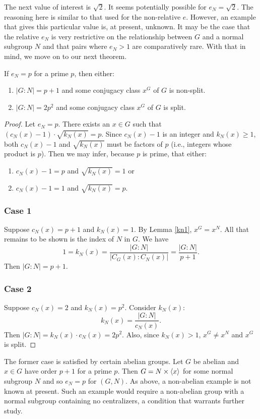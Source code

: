 \documentclass[main.tex]{subfiles}
\begin{document}
The next value of interest is $\sqrt{2}$. It seems potentially possible for $e_N = \sqrt{2}$. The reasoning here is similar to that used for the non-relative $e$. However, an example that gives this particular value is, at present, unknown. It may be the case that the relative $e_N$ is very restrictive on the relationship between $G$ and a normal subgroup $N$ and that pairs where $e_N > 1$ are comparatively rare. With that in mind, we move on to our next theorem.

\begin{theorem}
If $e_N = p$ for a prime $p$, then either:
\begin{enumerate}
	\item $|G:N| = p + 1$ and some conjugacy class $x^G$ of $G$ is non-split.
	\item $|G:N| = 2p^2$ and some conjugacy class $x^G$ of $G$ is split.
\end{enumerate}
\end{theorem}

\begin{proof}
Let $e_N = p$. There exists an $x \in G$ such that $(c_N(x) - 1) \cdot \sqrt{k_N(x)} = p$. Since $c_N(x) - 1$ is an integer and $k_N(x) \ge 1$, both $c_N(x) - 1$ and $\sqrt{k_N(x)}$ must be factors of $p$ (i.e., integers whose product is $p$). Then we may infer, because $p$ is prime, that either:
\begin{enumerate}
	\item $c_N(x) - 1 = p$ and $\sqrt{k_N(x)} = 1$ or
	\item $c_N(x) - 1 = 1$ and $\sqrt{k_N(x)} = p$.
\end{enumerate}

\subsubsection*{Case 1} Suppose $c_N(x) = p + 1$ and $k_N(x) = 1$. By Lemma \ref{kn1}, $x^G = x^N$. All that remains to be shown is the index of $N$ in $G$. We have
$$1 = k_N(x) = \frac{|G : N|}{|C_G(x):C_N(x)|} = \frac{|G : N|}{p + 1}\text{.}$$
Then $|G:N| = p+1$.

\subsubsection*{Case 2} Suppose $c_N(x) = 2$ and $k_N(x) = p^2$. Consider $k_N(x)$:
$$k_N(x) = \frac{|G:N|}{c_N(x)}\text{.}$$
Then $|G:N| = k_N(x) \cdot c_N(x) = 2p^2$. Also, since $k_N(x) > 1$, $x^G \ne x^N$ and $x^G$ is split.
\end{proof}

The former case is satisfied by certain abelian groups. Let $G$ be abelian and $x \in G$ have order $p + 1$ for a prime $p$. Then $G = N \times \langle x \rangle$ for some normal subgroup $N$ and so $e_N = p$ for $(G, N)$. As above, a non-abelian example is not known at present. Such an example would require a non-abelian group with a normal subgroup containing no centralizers, a condition that warrants further study.
\end{document}
